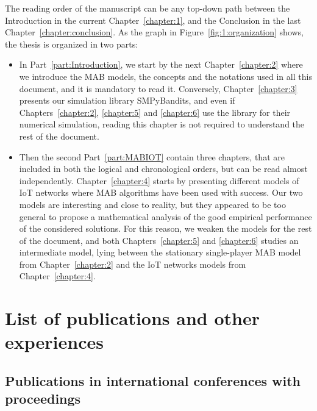 The reading order of the manuscript can be any top-down path between the Introduction in the current Chapter~\ref{chapter:1}, and the Conclusion in the last Chapter~\ref{chapter:conclusion}. As the graph in Figure~\ref{fig:1:organization} shows,
the thesis is organized in two parts:

\begin{itemize}
    \item
In Part~\ref{part:Introduction}, we start by the next Chapter~\ref{chapter:2} where we introduce the MAB models, the concepts and the notations used in all this document, and it is mandatory to read it.
Conversely, Chapter~\ref{chapter:3} presents our simulation library SMPyBandits, and even if Chapters~\ref{chapter:2}, \ref{chapter:5} and \ref{chapter:6} use the library for their numerical simulation, reading this chapter is not required to understand the rest of the document.

    \item
Then the second Part~\ref{part:MABIOT} contain three chapters, that are included in both the logical and chronological orders, but can be read almost independently.
Chapter~\ref{chapter:4} starts by presenting different models of IoT networks where MAB algorithms have been used with success. Our two models are interesting and close to reality, but they appeared to be too general to propose a mathematical analysis of the good empirical performance of the considered solutions.
For this reason, we weaken the models for the rest of the document,
and both Chapters~\ref{chapter:5} and \ref{chapter:6} studies an intermediate model, lying between the stationary single-player MAB model from Chapter~\ref{chapter:2} and the IoT networks models from Chapter~\ref{chapter:4}.
\end{itemize}


\section{List of publications and other experiences}
\label{sec:1:listPublications}

\subsection{Publications in international conferences with proceedings}

